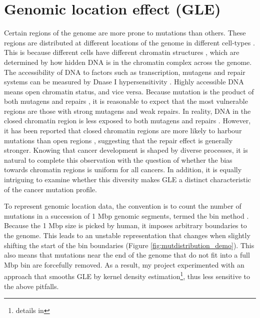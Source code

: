 \section{Genomic location effect (GLE)}
\label{intro:gle}
Certain regions of the genome are more prone to mutations than others. These regions are distributed at different locations of the genome in different cell-types \citep{Polak2015}. This is because different cells have different chromatin structures \citep{Abascal2020ExpandedGenomes}, which are determined by how hidden DNA is in the chromatin complex across the genome. The accessibility of DNA to factors such as transcription, mutagens and repair systems can be measured by Dnase I hypersensitivity \citep[DHS;][]{Liu2019AApplications}. Highly accessible DNA means open chromatin status, and vice versa. Because mutation is the product of both \glspl{mutagen} and repairs \citep{Ripley2001Mutation}, it is reasonable to expect that the most vulnerable regions are those with strong mutagens and weak repairs. In reality, DNA in the closed chromatin region is less exposed to both mutagens and repairs \citep[Figure \ref{fig:chromatin_demo};][]{Teng1997ExcisionSequences, Morse2002PhotoreactivationCerevisiae}. However, it has been reported that closed chromatin regions are more likely to harbour mutations than open regions \citep{Polak2015,Prendergast2007ChromatinGenome}, suggesting that the repair effect is generally stronger. Knowing that cancer development is shaped by diverse processes, it is natural to complete this observation with the question of whether the bias towards chromatin regions is uniform for all cancers. In addition, it is equally intriguing to examine whether this diversity makes GLE a distinct characteristic of the cancer mutation profile. 



To represent genomic location data, the convention is to count the number of mutations in a succession of 1 Mbp genomic segments, termed the bin method \citep{Kubler2019, Salvadores2019PassengerTumors, Chalmers2017AnalysisBurden, Salvadores2020MatchingPatterns}. Because the 1 Mbp size is picked by human, it imposes arbitrary boundaries to the genome. This leads to an unstable representation that changes when slightly shifting the start of the bin boundaries (Figure \ref{fig:mutdistribution_demo}). This also means that mutations near the end of the genome that do not fit into a full Mbp bin are forcefully removed. As a result, my project experimented with an approach that smooths GLE by kernel density estimation\footnote{details in}, thus less sensitive to the above pitfalls. 

